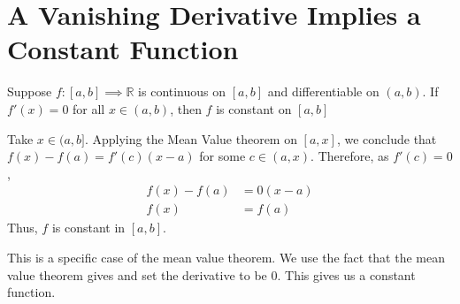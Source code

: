 \documentclass[12pt]{article}
\begin{document}
\section{A Vanishing Derivative Implies a Constant Function}
\begin{proposition}{}
    Suppose $f: [a, b] \implies \mathbb R$ is continuous on $[a, b]$ and differentiable on $(a, b)$. If $f'(x) = 0$ for all $x \in (a, b)$, then $f$ is constant on $[a, b]$\\
\end{proposition}
\newpage
\begin{prf}{}
    Take $x \in (a, b]$. Applying the Mean Value theorem on $[a, x]$, we conclude that $f(x) - f(a) = f'(c)(x - a)$ for some $c \in (a, x)$. Therefore, as $f'(c) = 0$, \\
\begin{align*}
    f(x) - f(a) &= 0(x - a)\\
    f(x) &= f(a)
\end{align*}
Thus, $f$ is constant in $[a, b]$.
\end{prf}
\begin{explanation}{}
    This is a specific case of the mean value theorem. We use the fact that the mean value theorem gives and set the derivative to be 0. This gives us a constant function.
\end{explanation}
\end{document}
